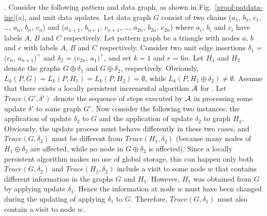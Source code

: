 
.
Consider the following pattern and data graph, as shown in Fig.~\ref{proof-patdata-inc}(a), and unit data updates.
Let data graph $G$ consist of two chains ($a_1$, $b_1$, $c_1$, \ldots, $a_n$, $b_n$, $c_n$) and ($a_{n+1}$, $b_{n+1}$, $c_{n+1}$, \ldots, $a_{2n}$, $b_{2n}$, $c_{2n}$) where $a_i$, $b_i$ and $c_i$ have labels $A$, $B$ and $C$ respectively.
Let pattern graph be a triangle with nodes $a$, $b$ and $c$ with labels $A$, $B$ and $C$ respectively.
Consider two unit edge insertions $\delta_1$ = $(c_n$, $a_{n+1})^+$ and $\delta_2$ = $(c_{2n}$, $a_1)^+$,
and set $k = 1$ and $r$ = $6n$.
Let $H_1$ and $H_2$ denote the graphs $G\oplus \delta_1$ and $G\oplus \delta_2$, respectively.
Obviously, $L_{k}(P, G) = L_{k}(P, H_1) = L_{k}(P, H_2) = \emptyset$,
while $L_{k}(P, H_1\oplus \delta_2) \neq \emptyset$.
Assume that there exists a locally persistent incremental algorithm ${\cal A}$ for \dynteamF.
Let $Trace(G', \delta')$ denote the sequence of steps executed by ${\cal A}$ in processing some update $\delta'$ to some graph $G'$.
Now consider the following two instances: the application of update $\delta_2$ to $G$ and the application of update $\delta_2$ to graph $H_1$.
Obviously, the update process must behave differently in these two cases, and $Trace(G, \delta_2)$ must be different from $Trace(H_1, \delta_2)$
(because many nodes of $H_1\oplus \delta_2$ are affected, while no node in $G\oplus \delta_2$ is affected).
Since a locally persistent algorithm makes no use of global storage, this can happen only both $Trace(G, \delta_2)$ and $Trace(H_1, \delta_2)$ include a visit to some node $w$ that contains different information in the graphs $G$ and $H_1$.
However, $H_1$ was obtained from $G$ by applying update $\delta_1$.
Hence the information at node $w$ must have been changed during the updating of applying $\delta_1$ to $G$.
Therefore, $Trace(G, \delta_1)$ must also contain a visit to node $w$.
